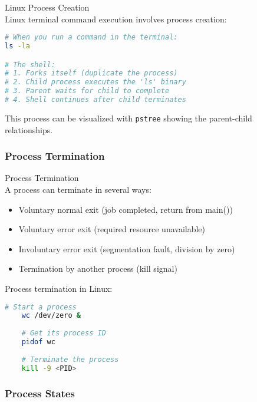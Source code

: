 \begin{example2}{Linux Process Creation}\\
    Linux terminal command execution involves process creation:
\begin{lstlisting}[language=bash, style=basesmol]
# When you run a command in the terminal:
ls -la

# The shell:
# 1. Forks itself (duplicate the process)
# 2. Child process executes the 'ls' binary
# 3. Parent waits for child to complete
# 4. Shell continues after child terminates
\end{lstlisting}

    This process can be visualized with \texttt{pstree} showing the parent-child relationships.
\end{example2}

\multend

\subsubsection{Process Termination}


\begin{definition}{Process Termination}\\
    A process can terminate in several ways:
    \begin{itemize}
        \item Voluntary normal exit (job completed, return from main())
        \item Voluntary error exit (required resource unavailable)
        \item Involuntary error exit (segmentation fault, division by zero)
        \item Termination by another process (kill signal)
    \end{itemize}
\end{definition}

\begin{example}
    Process termination in Linux:
    \begin{lstlisting}[language=bash, style=basesmol]
    # Start a process
    wc /dev/zero &
    
    # Get its process ID
    pidof wc
    
    # Terminate the process
    kill -9 <PID>
    \end{lstlisting}
\end{example}

\multend

\subsubsection{Process States}

